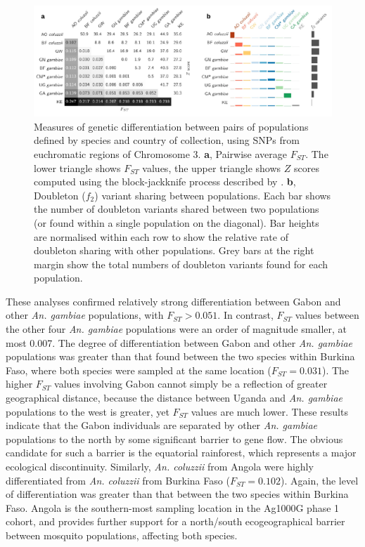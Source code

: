 \documentclass[a4paper,11pt,abstracton,hidelinks]{scrartcl}
\begin{document}
\begin{figure}[t!]
\centering
\includegraphics[width=1.1\textwidth,center]{artwork/chapter4/popdiff.pdf}
\caption{Measures of genetic differentiation between pairs of populations defined by species and country of collection, using SNPs from euchromatic regions of Chromosome 3.
%
\textbf{a}, Pairwise average $F_{ST}$.
%
The lower triangle shows $F_{ST}$ values, the upper triangle shows $Z$ scores computed using the block-jackknife process described by \textcite{Bhatia2013}.
%
\textbf{b}, Doubleton ($f_2$) variant sharing between populations.
%
Each bar shows the number of doubleton variants shared between two populations (or found within a single population on the diagonal).
%
Bar heights are normalised within each row to show the relative rate of doubleton sharing with other populations.
%
Grey bars at the right margin show the total numbers of doubleton variants found for each population.
%
}
\label{fig:popdiff}
\end{figure}


These analyses confirmed relatively strong differentiation between Gabon and other \textit{An. gambiae} populations, with $F_{ST} > 0.051$.
%
In contrast, $F_{ST}$ values between the other four \textit{An. gambiae} populations were an order of magnitude smaller, at most 0.007.
%
The degree of differentiation between Gabon and other \textit{An. gambiae} populations was greater than that found between the two species within Burkina Faso, where both species were sampled at the same location ($F_{ST} = 0.031$).
%
The higher $F_{ST}$ values involving Gabon cannot simply be a reflection of greater geographical distance, because the distance between Uganda and \textit{An. gambiae} populations to the west is greater, yet $F_{ST}$ values are much lower.
%
These results indicate that the Gabon individuals are separated by other \textit{An. gambiae} populations to the north by some significant barrier to gene flow.
%
The obvious candidate for such a barrier is the equatorial rainforest, which represents a major ecological discontinuity.
%
Similarly, \textit{An. coluzzii} from Angola were highly differentiated from \textit{An. coluzzii} from Burkina Faso ($F_{ST} = 0.102$).
%
Again, the level of differentiation was greater than that between the two species within Burkina Faso.
%
Angola is the southern-most sampling location in the Ag1000G phase 1 cohort, and provides further support for a north/south ecogeographical barrier between mosquito populations, affecting both species.
\end{document}
